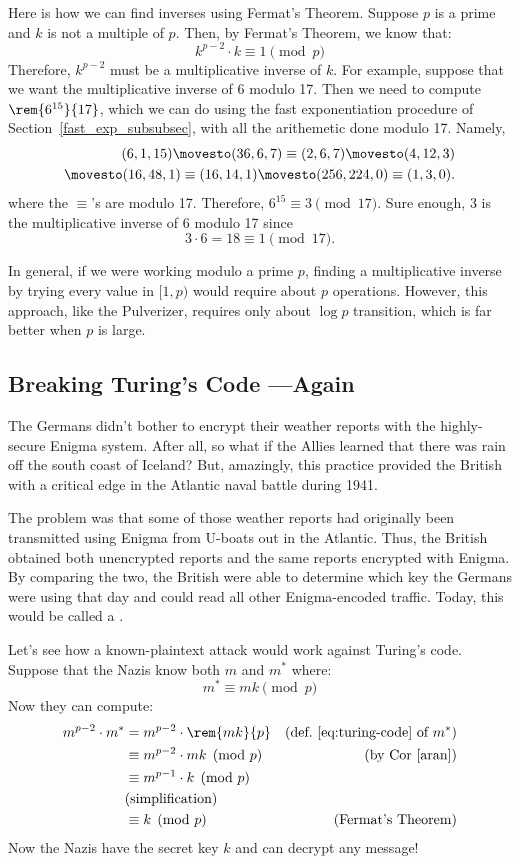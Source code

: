 Here is how we can find inverses using Fermat's Theorem.  Suppose $p$ is a prime and $k$ is
not a multiple of $p$.  Then, by Fermat's Theorem, we know that:
\[
k^{p-2} \cdot k \equiv 1 \pmod{p}
\]
Therefore, $k^{p-2}$ must be a multiplicative inverse of $k$.  For example, suppose that we
want the multiplicative inverse of 6 modulo 17.  Then we need to compute
$\rem{6^{15}}{17}$, which we can do using the fast exponentiation procedure of
Section~\ref{fast_exp_subsubsec}, with all the arithemetic done modulo 17.  Namely,
\begin{align*}
(6,1,15) \movesto (36,6,7) \equiv (2,6,7) \movesto (4,12,3)\\ \movesto (16,48,1) \equiv
  (16,14,1) \movesto (256,224,0) \equiv (1,3,0).
\end{align*}
where the $\equiv$'s are modulo 17.  Therefore, $6^{15} \equiv 3 \pmod{17}$.  Sure enough,
3 is the multiplicative inverse of 6 modulo 17 since
\[
3 \cdot 6 = 18 \equiv 1 \pmod{17}.
\]

In general, if we were working modulo a prime $p$, finding a multiplicative inverse by
trying every value in $[1, p)$ would require about $p$ operations.  However, this approach,
  like the Pulverizer, requires only about $\log p$ transition, which is far better when
  $p$ is large.

\subsection{Breaking Turing's Code ---Again}

The Germans didn't bother to encrypt their weather reports with the highly-secure Enigma
system.  After all, so what if the Allies learned that there was rain off the south coast
of Iceland?  But, amazingly, this practice provided the British with a critical edge in the
Atlantic naval battle during 1941.

The problem was that some of those weather reports had originally been transmitted using
Enigma from U-boats out in the Atlantic.  Thus, the British obtained both unencrypted
reports and the same reports encrypted with Enigma.  By comparing the two, the British were
able to determine which key the Germans were using that day and could read all other
Enigma-encoded traffic.  Today, this would be called a .

Let's see how a known-plaintext attack would work against Turing's code.  Suppose that the
Nazis know both $m$ and $m^*$ where:
\[
m^* \equiv mk \pmod{p}
\]
 Now they can compute:
\begin{align*}
m^{p-2} \cdot m^* & = m^{p-2} \cdot \rem{mk}{p} & \text{(def.~\eqref{eq:turing-code} of
  $m^*$)}\\ & \equiv m^{p-2} \cdot mk \pmod{p} & \text{(by Cor~\ref{aran})}\\ & \equiv
m^{p-1} \cdot k \pmod{p}\\
 & \text{(simplification)}\\ & \equiv k \pmod{p} & \text{(Fermat's Theorem)}
\end{align*}
Now the Nazis have the secret key $k$ and can decrypt any message!

